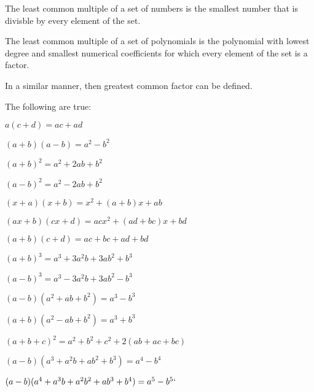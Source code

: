 \documentclass[crop=false,class=book,oneside]{standalone}
\begin{document}
            \begin{definition}
                The least common multiple of a set of numbers
                is the smallest number that is divisble by
                every element of the set.
            \end{definition}
            \begin{definition}
                The least common multiple of a set of polynomials
                is the polynomial with lowest degree and smallest
                numerical coefficients for which every element
                of the set is a factor.
            \end{definition}
            In a similar manner, then greatest common factor
            can be defined.
            \begin{theorem*}
                The following are true:
                \begin{enumerate}
                    \begin{multicols}{2}
                        \item $a(c+d)=ac+ad$
                        \item $(a+b)(a-b)=a^{2}-b^{2}$
                        \item $(a+b)^{2}=a^{2}+2ab+b^{2}$
                        \item $(a-b)^{2}=a^{2}-2ab+b^{2}$
                        \item $(x+a)(x+b)=x^{2}+(a+b)x+ab$
                        \item $(ax+b)(cx+d)=acx^{2}+(ad+bc)x+bd$
                        \item $(a+b)(c+d)=ac+bc+ad+bd$
                        \item $(a+b)^{3}=%
                               a^{3}+3a^{2}b+3ab^{2}+b^{3}$
                        \item $(a-b)^{3}=%
                               a^{3}-3a^{2}b+3ab^{2}-b^{3}$
                        \item $(a-b)(a^{2}+ab+b^{2})=a^{3}-b^{3}$
                        \item $(a+b)(a^{2}-ab+b^{2})=a^{3}+b^{3}$
                        \item $(a+b+c)^{2}=%
                               a^{2}+b^{2}+c^{2}+2(ab+ac+bc)$
                        \item $(a-b)(a^{3}+a^{2}b+ab^{2}+b^{3})=%
                               a^{4}-b^{4}$
                        \item $(a-b)%
                               (a^{4}+a^{3}b+%
                                a^{2}b^{2}+ab^{3}+b^{4})%
                               =a^{5}-b^{5}`$
                    \end{multicols}
                \end{enumerate}
            \end{theorem*}
\end{document}

